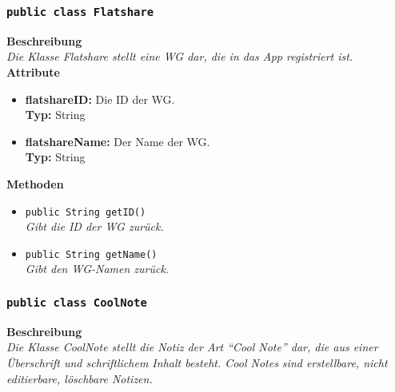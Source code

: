 \subsubsection{\texttt{public class Flatshare}}

	\textbf{Beschreibung} \\
	\textit{Die Klasse Flatshare stellt eine WG dar, die in das App registriert ist.} \\
	
	\textbf{Attribute}
	\begin{itemize}
		\item \textbf{flatshareID:} Die ID der WG. \\
		\textbf{Typ:} String
		\item \textbf{flatshareName:} Der Name der WG. \\
		\textbf{Typ:} String
	\end{itemize}

	\textbf{Methoden}
	\begin{itemize}
		\item\texttt{{public String getID()}}\\
		\textit{Gibt die ID der WG zurück.}\\
		\item\texttt{{public String getName()}}\\
		\textit{Gibt den WG-Namen zurück.}\\
	\end{itemize}

\subsubsection{\texttt{public class CoolNote}}

	\textbf{Beschreibung} \\
	\textit{Die Klasse CoolNote stellt die Notiz der Art “Cool Note” dar, die aus einer Überschrift und schriftlichem Inhalt besteht. Cool Notes sind erstellbare, nicht editierbare, löschbare Notizen.} \\
	
